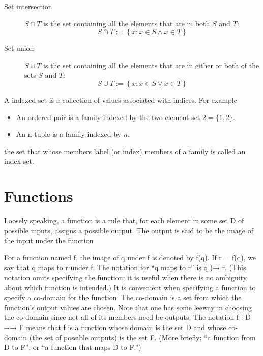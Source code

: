 
\begin{description}
\item[Set intersection] $S \cap T$ is the set containing all the elements that are in both $S$ and $T$:
\begin{equation}
S \cap T := \left\{{x: x \in S \land x \in T}\right\}
\end{equation}
\item[Set union] $S \cup T$ is the set containing all the elements that are in either or both of the sets $S$ and $T$:
\begin{equation}
S \cup T := \left\{{x: x \in S \lor x \in T}\right\}
\end{equation} 

\end{description}

A indexed set is a collection of values associated with indices. For example
\begin{itemize}
\item An ordered pair is a family indexed by the two element set $2 = \{1, 2\}$.
\item An n-tuple is a family indexed by $n$.
\end{itemize}
the set that whose members label (or index) members of a family is called an index set. 

\section{Functions}

Loosely speaking, a function is a rule that, for each element in some set D of possible inputs,  assigns a possible output. The output is said to be the image of the input under the function 

For a function named f, the image of q under f is denoted by f(q). If r = f(q), we say that  q maps to r under f. The notation for “q maps to r” is q )→ r. (This notation omits specifying  the function; it is useful when there is no ambiguity about which function is intended.)  It is convenient when specifying a function to specify a co-domain for the function. The  co-domain is a set from which the function’s output values are chosen. Note that one has some  leeway in choosing the co-domain since not all of its members need be outputs.  The notation  f : D −→ F  means that f is a function whose domain is the set D and whose co-domain (the set of possible  outputs) is the set F. (More briefly: “a function from D to F”, or “a function that maps D to F.”) 

